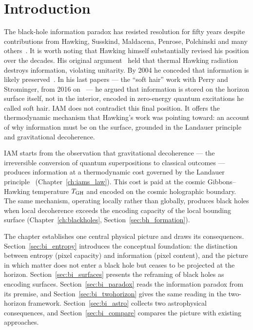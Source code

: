\section{Introduction}\label{sec:bi_intro}
The black-hole information paradox has resisted resolution for fifty years despite contributions from Hawking, Susskind, Maldacena, Penrose, Polchinski and
many others~\cite{Hawking1976,Page1993,Maldacena1998,AMPS2013,MaldacenaSusskind2013,Penrose1989}. It is worth noting that Hawking himself substantially revised his position over the decades. His
original argument~\cite{Hawking1975,Hawking1976} held that thermal Hawking radiation destroys information, violating unitarity. By 2004 he conceded that information is likely
preserved~\cite{Hawking2005}. In his last papers --- the ``soft hair'' work with Perry and Strominger, from 2016 on~\cite{HawkingPerryStrominger2016,Haco2018} --- he argued that information is stored on the
horizon surface itself, not in the interior, encoded in zero-energy quantum excitations he called soft hair. IAM does not contradict this final position. It
offers the thermodynamic mechanism that Hawking's work was pointing toward: an account of why information must be on the surface, grounded in the Landauer
principle and gravitational decoherence. \interp

IAM starts from the observation that gravitational decoherence --- the irreversible conversion of quantum superpositions to classical outcomes --- produces
information at a thermodynamic cost governed by the Landauer principle~\cite{Landauer1961} (Chapter~\ref{ch:iams_law}). This cost is paid at the cosmic Gibbons--Hawking
temperature $T_{\rm GH}$ and encoded on the cosmic holographic boundary. The same mechanism, operating locally rather than globally, produces black holes when
local decoherence exceeds the encoding capacity of the local bounding surface (Chapter~\ref{ch:blackholes}, Section~\ref{sec:bh_formation}).

The chapter establishes one central physical picture and draws its consequences. Section~\ref{sec:bi_entropy} introduces the conceptual foundation: the distinction between
entropy (pixel capacity) and information (pixel content), and the picture in which matter does not enter a black hole but ceases to be projected at the
horizon. Section~\ref{sec:bi_surfaces} presents the reframing of black holes as encoding surfaces. Section~\ref{sec:bi_paradox} reads the information paradox from its premise,
and Section~\ref{sec:bi_twohorizon} gives the same reading in the two-horizon framework. Section~\ref{sec:bi_astro} collects two astrophysical consequences, and
Section~\ref{sec:bi_compare} compares the picture with existing approaches.

